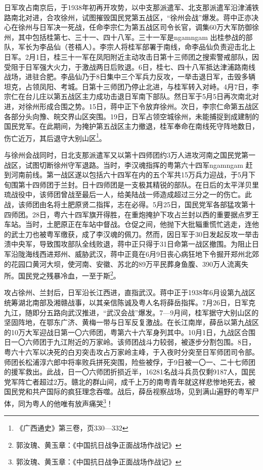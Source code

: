 日军攻占南京后，于1938年初再开攻势，以中支那派遣军、北支那派遣军沿津浦铁路南北对进，合攻徐州，试图摧毁国民党第五战区，“徐州会战”爆发。蒋中正亦决心在徐州与日军决一死战，任命李宗仁为第五战区司令长官，调集60万大军防御徐州，其中包括桂第七、三十一、四十八军。三十一军是ngamngam 出桂参战的部队，军长为李品仙（苍梧人）。李宗人将桂军部署于南线，命李品仙负责迎击北上日军。2月1日，桂三十一军在凤阳附近主动攻击日第十三师团之搜索警戒部队，因受阻于日军强大火力，于激战两日后败退。6日，桂七、四十八军抵达津浦路南线战场，进驻合肥。李品仙乃于8日集中三个军兵力反攻，一举击退日军，击毁多辆坦克，占领凤阳、考城。日第十三师团乃停止北进，与桂军转入对峙。4月7日，李宗仁在台儿庄以第五战区主力成功击退日军南下部队。然日军于5月5日再次南北对进，对徐州形成合围之势。15日，蒋中正下令放弃徐州。次日，李宗仁命第五战区各部分头向豫、皖交界山区突围。19日，日军占领空城徐州，未能捕捉到成建制的国民党军。在此期间，为掩护第五战区主力撤退，桂军奉命在南线死守阵地数日，伤亡近万，其后退守大别山区\footnote{《广西通史》第三卷，页330—332}。

与徐州会战同时，日北支那派遣军又以第十四师团约3万人进攻河南之国民党第一战区，试图切断徐州守军退路。当时，李汉魂指挥的粤第六十四军ngamngam 赶到河南前线。第一战区遂以包括六十四军在内的五个军共15万兵力迎战，于5月下旬围第十四师团于兰封。日十四师团是一支极其精锐的部队。在日后的太平洋贝里琉战役中，该师团曾战至最后一人，给美陆战一师造成超过三分之一的伤亡。此战，该师团由名将土肥原贤二指挥，志在必得。5月25日，国民党军各部猛攻第十四师团。28日，粤六十四军旗开得胜，在重炮掩护下攻占兰封以西的重要据点罗王车站。当时，土肥原正在车站中督战。仓促之间，他抛下大批辎重慌忙逃走，连他的武士刀也被粤军缴获，成了李汉魂的佩刀。然而，因日军于30日发起反攻一举击溃中央军，导致围攻部队全线败退，蒋中正只得于31日命第一战区撤围。为阻止日军沿陇海线西进郑州、威胁武汉，蒋中正竟在6月9日丧心病狂地下令掘开郑州北郊的花园口黄河大坝，使河南、安徽、苏北的89万平民葬身鱼腹、390万人流离失所。国民党之残暴冷血，一至于斯\footnote{郭汝瑰、黄玉章：《中国抗日战争正面战场作战记》}。

攻占徐州、兰封后，日军沿长江西进，直指武汉。蒋中正于1938年6月设第九战区统筹湖北南部及湘赣战事，以其亲信陈诚及粤人名将薛岳指挥。7月26日，日军克九江，随即分五路向武汉推进，“武汉会战”爆发。7—9月间，桂军据守大别山区的坚固阵地，在鄂东广济、黄梅一带与日军反复激战。在长江南岸，薛岳以第九战区的10万大军迎战日第一〇六师团，粤第六十六军身列其中。10月1日，九战区合围日一〇六师团于九江附近的万家岭。该师团战斗力较弱，被逐步分割包围。8日，粤六十六军以决死的白刃突击攻占万家岭主峰，于入夜时分突至日军师团司令部。师团长松浦淳六郎中将率败兵拼死突围，险些被俘，于9日被一〇一、二十七师团的援军救出。此战，日一〇六师团折损近半，16281名战斗兵员仅剩9187人，国民党军阵亡者超过2万。赣北的群山间，成千上万的南粤青年就这样悲惨地死去，被国民党和共产国际的疯狂理念吞噬。战后，薛岳视察战场，见到满山遍野的粤军尸体，同为粤人的他唯有放声痛哭\footnote{郭汝瑰、黄玉章：《中国抗日战争正面战场作战记》}！

